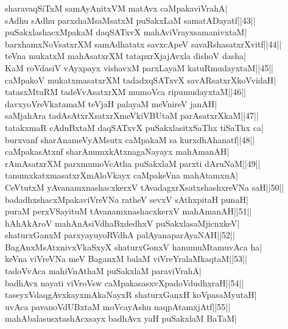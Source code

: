 \documentclass{article}
\begin{document}
sharavaqSiTxM samAyAnitxVM matAvx caMpakaviVrahA|\\
sAdhu sAdhu parxshaMsaMsatxM puSakxLaM samatADayatf||43||\\
puSakxlashacxMpakaM daqSATxvX mahAviVrayxsamanivxtaM|\\
barxhamxNoVsatxrXM samAdhatatx savxcApeV savaRshasatxrXvitf||44||\\
teVna mukatxM mahAsatxrXM tatapxrXjajAvxla dishoV dasha|\\
KaM roVdasiV vAyxpayx vishavxM parxLayaM katuRmudayxtaM||45||\\
caMpakoV mukatxmasatxrXM tadadxqSATxvX savARsatxrXkoVvidaH|\\
tatasxMtuRM tadeVvAsatxrXM mumoVca ripumudayxtaM||46||\\
davxyoVreVkatamaM teVjaH palayaM meVnireV janAH|\\
saMja{hA}ra tadAsAtxrXsatxrXmeVkiVBUtaM parAsatxrXkaM||47||\\
tatakxmaR cAduBxtaM daqSATxvX puSakxlasitxSaThx tiSaThx ca|\\
burxvanf sharAnameVyAMsutx caMpakaM sa kurxdhAhanatf||48||\\
caMpakasAtxnf sharAnumxkAtxnagaNayayx mahAmanAH|\\
rAmAsatxrXM parxmumoVcAtha puSakxlaM parxti dAruNaM||49||\\
tanumxkatxmasatxrXmAloVkayx caMpakeVna mahAtamxnA|\\
CeVtutxM yAvanamxnashacxkerxV tAvadagxrXsatxshashxreVNa saH||50||\\
badadhxshacxMpakaviVreVNa ratheV sevxV sAthxpitaH punaH|\\
puraM perxVSayituM tAvanamxnashacxkerxV mahAmanAH||51||\\
hAhAkAroV mahAnAsiVdhaBxdedhxV puSakxlasaMjicnxkeV|\\
shaturxGanxM parxyayuyoRVdhA palAyanaparAyaNAH||52||\\
BagAnxMsAtxnivxVkaSxyX shaturxGonxV hanumuMtamuvAca ha|\\
keVna viVreVNa meV BaganxM balaM viVreYralaMkaqtaM||53||\\
tadoVvAca mahiVnAthaM puSakxlaM paraviVrahA|\\
badhAvx nayati viVroVsw caMpakasasxvXpadoVdudhxraH||54||\\
taseyxVdaqgAvxkayxmAkaNayxR shaturxGanxH koVpasaMyutaH|\\
uvAca pavanoVdUBxtaM moVcayAshu naqpAtamxjAtf||55||\\
mahAbalasusxtashAcxsayx badhAvx yaH puSakxlaM BaTaM|\\
\end{document}
